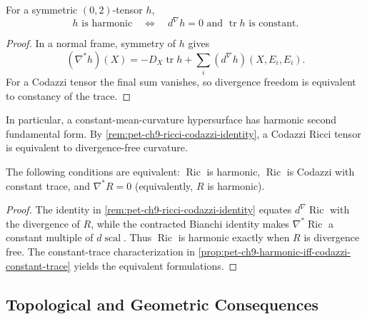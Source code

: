\begin{proposition}
  \label{prop:pet-ch9-harmonic-iff-codazzi-constant-trace}
  For a symmetric $(0,2)$-tensor $h$,
  \[
    h\text{ is harmonic}\quad\Longleftrightarrow\quad
    d^\nabla h=0\text{ and }\operatorname{tr}h\text{ is constant}.
  \]
\end{proposition}
\begin{proof}
  \sketch
  In a normal frame, symmetry of \(h\) gives
  \[
    (\nabla^*h)(X)=-D_X\operatorname{tr}h
      +\sum_i(d^\nabla h)(X,E_i,E_i).
  \]
  For a Codazzi tensor the final sum vanishes, so divergence freedom is
  equivalent to constancy of the trace.
\end{proof}

In particular, a constant-mean-curvature hypersurface has harmonic second
fundamental form.  By \cref{rem:pet-ch9-ricci-codazzi-identity}, a Codazzi Ricci
tensor is equivalent to divergence-free curvature.

\begin{corollary}
  \label{cor:pet-ch9-ricci-harmonic-iff-curvature-harmonic}
  The following conditions are equivalent: $\operatorname{Ric}$ is harmonic,
  $\operatorname{Ric}$ is Codazzi with constant trace, and
  $\nabla^*R=0$ (equivalently, $R$ is harmonic).
\end{corollary}
\begin{proof}
  \sketch
  The identity in \cref{rem:pet-ch9-ricci-codazzi-identity} equates
  \(d^\nabla\operatorname{Ric}\) with the divergence of \(R\), while the
  contracted Bianchi identity makes \(\nabla^*\operatorname{Ric}\) a constant
  multiple of \(d\operatorname{scal}\).  Thus \(\operatorname{Ric}\) is
  harmonic exactly when \(R\) is divergence free.  The constant-trace
  characterization in \cref{prop:pet-ch9-harmonic-iff-codazzi-constant-trace}
  yields the equivalent formulations.
\end{proof}

\subsection{Topological and Geometric Consequences}

